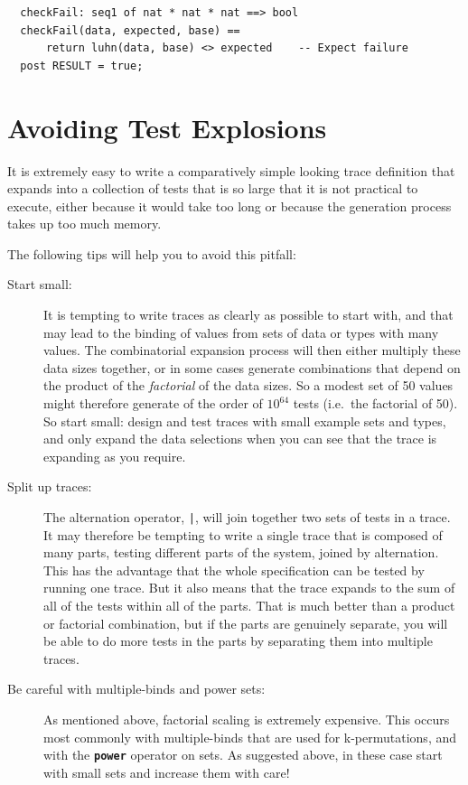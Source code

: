 \documentclass{overturerepchap}
\begin{document}
\scriptsize
\begin{lstlisting}
  checkFail: seq1 of nat * nat * nat ==> bool
  checkFail(data, expected, base) ==
      return luhn(data, base) <> expected    -- Expect failure
  post RESULT = true;
\end{lstlisting}
\normalsize

\section{Avoiding Test Explosions}

It is extremely easy to write a comparatively simple looking trace definition
that expands into a collection of tests that is so large that it is not
practical to execute, either because it would take too long or because the
generation process takes up too much memory.

The following tips will help you to avoid this pitfall:

\begin{description}
  \item[Start small:] It is tempting to write traces as clearly as
  possible to start with, and that may lead to the binding of values from sets
  of data or types with many values. The combinatorial expansion process will
  then either multiply these data sizes together, or in some cases generate 
  combinations that depend on the product of the \emph{factorial} of the data
  sizes. So a modest set of 50 values might therefore generate of the order of
  $10^{64}$ tests (i.e.\ the factorial of 50). So start small: design and test 
  traces with small example sets and types, and only expand the data selections
  when you can see that the trace is expanding as you require.
  \item[Split up traces:] The alternation operator, \texttt{|}, will join
  together two sets of tests in a trace. It may therefore be tempting to write a
  single trace that is composed of many parts, testing different parts of the
  system, joined by alternation. This has the advantage that the whole
  specification can be tested by running one trace. But it also means that the
  trace expands to the sum of all of the tests within all of the parts. That is
  much better than a product or factorial combination, but if the parts are
  genuinely separate, you will be able to do more tests in the parts by
  separating them into multiple traces.
  \item[Be careful with multiple-binds and power sets:] As mentioned
  above, factorial scaling is extremely expensive. This occurs most commonly
  with multiple-binds that are used for k-permutations, and with the
  \texttt{\textbf{power}} operator on sets. As suggested above, in these case start with
  small sets and increase them with care!
\end{description}
\end{document}
